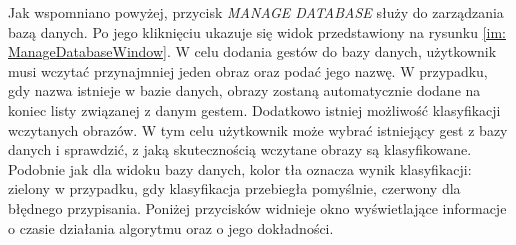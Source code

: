 Jak wspomniano powyżej, przycisk \textit{MANAGE DATABASE} służy do zarządzania bazą danych. Po jego kliknięciu ukazuje się widok przedstawiony na rysunku \ref{im: ManageDatabaseWindow}. W celu dodania gestów do bazy danych, użytkownik musi wczytać przynajmniej jeden obraz oraz podać jego nazwę. W przypadku, gdy nazwa istnieje w bazie danych, obrazy zostaną automatycznie dodane na koniec listy związanej z danym gestem.
Dodatkowo istniej możliwość klasyfikacji wczytanych obrazów. W tym celu użytkownik może wybrać istniejący gest z bazy danych i sprawdzić, z jaką skutecznością wczytane obrazy są klasyfikowane. Podobnie jak dla widoku bazy danych, kolor tła oznacza wynik klasyfikacji: zielony w przypadku, gdy klasyfikacja przebiegła pomyślnie, czerwony dla błędnego przypisania. Poniżej przycisków widnieje okno wyświetlające informacje o czasie działania algorytmu oraz o jego dokładności.




























